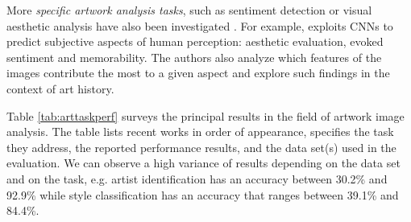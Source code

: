 \documentclass[acmlarge]{acmart}
\begin{document}
More \textit{specific artwork analysis tasks}, such as sentiment detection or visual aesthetic analysis have also been investigated \cite{li2009aesthetic,amirshahi2014jenaesthetics,Alameda-Pineda_2016_CVPR,brachmann2017using, brachmann2017computational,kang2018method,cetinic2019deep}. For example,  \cite{cetinic2019deep} exploits CNNs to predict subjective aspects of human perception: aesthetic evaluation, evoked sentiment and memorability. The authors also analyze which features  of the images contribute the most to a given aspect and explore such findings in the context of art history.

Table \ref{tab:arttaskperf} surveys the principal results in the field of artwork image  analysis. 
The table lists   recent  works in order of appearance,  specifies the task they address, the reported performance results, and the data set(s) used in the evaluation. We can observe a high variance of results depending on the data set and on the task, e.g. artist identification has an accuracy between 30.2\% and 92.9\% while style classification has an accuracy that ranges between 39.1\% and 84.4\%.
\end{document}
